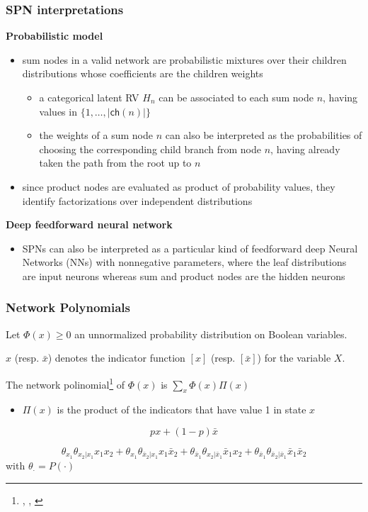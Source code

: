 \documentclass[10pt, t, xcolor={usenames,dvipsnames,svgnames}, compress]{beamer}
\newcommand{\customcite}[1]{\footnote{\scriptsize \citeauthor{#1}, \citetitle{#1}, \citeyear{#1}}}
\begin{document}
\begin{frame}
\frametitle{SPN interpretations}
{\color{orange}\textbf{Probabilistic model}}
\begin{itemize}
\item sum nodes in a valid network are probabilistic mixtures over their
  children distributions whose coefficients are the children weights 
\begin{itemize}
\item a categorical latent RV $H_n$ can be associated to each sum node $n$,
  having values in $\{1,\ldots, |\mathsf{ch}(n)|\}$
\item the weights of a sum node $n$ can also be interpreted as the probabilities
  of choosing the corresponding child branch from node $n$, having already taken
  the path from the root up to $n$
\end{itemize}
\item since product nodes are evaluated as product of probability
values, they identify factorizations over independent distributions  
\end{itemize}
{\color{orange}\textbf{Deep feedforward neural network}}
\begin{itemize}
\item SPNs  can  also  be  interpreted  as  a  particular  kind  of  feedforward  deep  Neural
Networks  (NNs)  with  nonnegative  parameters,  where  the  leaf  distributions
are input neurons whereas sum and product nodes are the hidden neurons
\end{itemize}
\end{frame}


\begin{frame}
\frametitle{Network Polynomials}

Let $\Phi(x) \geq 0$ an unnormalized probability distribution on Boolean
variables.

$x$ (resp. $\bar{x}$) denotes the indicator function $[x]$ (resp. $[\bar{x}]$) for
the variable $X$.

The network polinomial\customcite{Darwiche2003} of $\Phi(x)$ is $\sum_x \Phi(x) \Pi(x)$
\begin{itemize}
\item $\Pi(x)$ is the product of the indicators that have value 1 in state $x$
\end{itemize}
\begin{example}
$$px + (1-p)\bar{x}$$
\end{example}
\begin{example}
$$\theta_{x_1}\theta_{x_2|x_1}x_1x_2 +
\theta_{x_1}\theta_{\bar{x}_2|x_1}x_1\bar{x}_2 + 
\theta_{\bar{x}_1}\theta_{x_2|\bar{x}_1}\bar{x}_1x_2 +
\theta_{\bar{x}_1}\theta_{\bar{x}_2|\bar{x}_1}\bar{x}_1\bar{x}_2$$
with $\theta_{\cdot}=P(\cdot)$ 
\end{example}
\end{frame}
\end{document}
